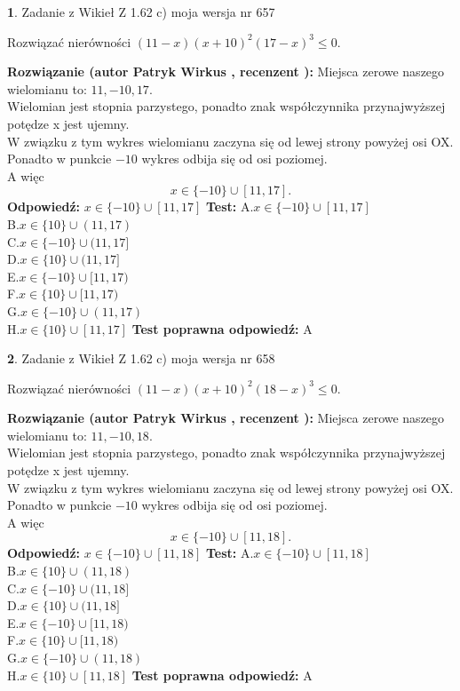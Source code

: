 \documentclass[12pt, a4paper]{article}
\theoremstyle{definition} %
\newtheorem{zad}{}
\newcommand{\zadStart}[1]{\begin{zad}#1\newline}
\newcommand{\zadStop}{\end{zad}}
\newcommand{\rozwStart}[2]{\noindent \textbf{Rozwiązanie (autor #1 , recenzent #2): }\newline}
\newcommand{\rozwStop}{\newline}
\newcommand{\odpStart}{\noindent \textbf{Odpowiedź:}\newline}
\newcommand{\odpStop}{\newline}
\newcommand{\testStart}{\noindent \textbf{Test:}\newline}
\newcommand{\testStop}{\newline}
\newcommand{\kluczStart}{\noindent \textbf{Test poprawna odpowiedź:}\newline}
\newcommand{\kluczStop}{\newline}
\begin{document}
\zadStart{Zadanie z Wikieł Z 1.62 c) moja wersja nr 657}

Rozwiązać nierówności $(11-x)(x+10)^{2}(17-x)^{3}\le0$.
\zadStop
\rozwStart{Patryk Wirkus}{}
Miejsca zerowe naszego wielomianu to: $11, -10, 17$.\\
Wielomian jest stopnia parzystego, ponadto znak współczynnika przy\linebreak najwyższej potędze x jest ujemny.\\ W związku z tym wykres wielomianu zaczyna się od lewej strony powyżej osi OX.\\
Ponadto w punkcie $-10$ wykres odbija się od osi poziomej.\\
A więc $$x \in \{-10\} \cup [11,17].$$
\rozwStop
\odpStart
$x \in \{-10\} \cup [11,17]$
\odpStop
\testStart
A.$x \in \{-10\} \cup [11,17]$\\
B.$x \in \{10\} \cup (11,17)$\\
C.$x \in \{-10\} \cup (11,17]$\\
D.$x \in \{10\} \cup (11,17]$\\
E.$x \in \{-10\} \cup [11,17)$\\
F.$x \in \{10\} \cup [11,17)$\\
G.$x \in \{-10\} \cup (11,17)$\\
H.$x \in \{10\} \cup [11,17]$
\testStop
\kluczStart
A
\kluczStop



\zadStart{Zadanie z Wikieł Z 1.62 c) moja wersja nr 658}

Rozwiązać nierówności $(11-x)(x+10)^{2}(18-x)^{3}\le0$.
\zadStop
\rozwStart{Patryk Wirkus}{}
Miejsca zerowe naszego wielomianu to: $11, -10, 18$.\\
Wielomian jest stopnia parzystego, ponadto znak współczynnika przy\linebreak najwyższej potędze x jest ujemny.\\ W związku z tym wykres wielomianu zaczyna się od lewej strony powyżej osi OX.\\
Ponadto w punkcie $-10$ wykres odbija się od osi poziomej.\\
A więc $$x \in \{-10\} \cup [11,18].$$
\rozwStop
\odpStart
$x \in \{-10\} \cup [11,18]$
\odpStop
\testStart
A.$x \in \{-10\} \cup [11,18]$\\
B.$x \in \{10\} \cup (11,18)$\\
C.$x \in \{-10\} \cup (11,18]$\\
D.$x \in \{10\} \cup (11,18]$\\
E.$x \in \{-10\} \cup [11,18)$\\
F.$x \in \{10\} \cup [11,18)$\\
G.$x \in \{-10\} \cup (11,18)$\\
H.$x \in \{10\} \cup [11,18]$
\testStop
\kluczStart
A
\kluczStop
\end{document}
